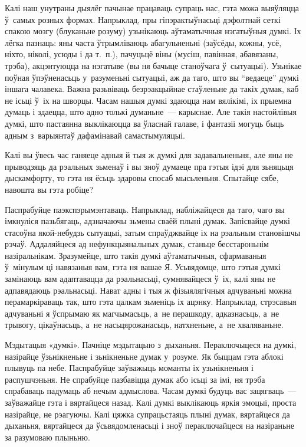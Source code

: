 Калі наш унутраны дыялёг пачынае працаваць супраць нас, гэта можа выяўляцца ў~самых розных формах. Напрыклад, пры гіпэрактыўнасьці дэфолтнай сеткі спакою мозгу (блуканьне розуму) узьнікаюць аўтаматычныя нэгатыўныя думкі. Іх лёгка пазнаць: яны часта ўтрымліваюць абагульненьні (заўсёды, кожны, усё, ніхто, ніколі, усюды і да т.~п.), пачуцьцё віны (мусіш, павінная, абавязаны, трэба), акцэнтуюцца на нэгатыве (вы ня бачыце станоўчага ў~сытуацыі). Узьнікае поўная ўпэўненасьць у~разуменьні сытуацыі, аж да таго, што вы ``ведаеце'' думкі іншага чалавека. Важна разьвіваць безрэакцыйнае стаўленьне да такіх думак, каб не ісьці ў~іх на шворцы. Часам нашыя думкі здаюцца нам вялікімі, іх прыемна думаць і здаецца, што адно толькі думаньне~--- карыснае. Але такія настойлівыя думкі, што пастаянна выклікаюцца ва ўласнай галаве, і фантазіі могуць быць адным з~варыянтаў дафамінавай самастымуляцыі. 

Калі вы ўвесь час ганяеце адныя й тыя ж думкі для задавальненьня, але яны не прыводзяць да рэальных зьменаў і вы зноў думаеце пра гэтыя ідэі для зьняцьця дыскамфорту, то гэта ня ёсьць здаровы спосаб мысьленьня. Спытайце сябе, навошта вы гэта робіце?

Паспрабуйце паэкспэрымэнтаваць. Напрыклад, набліжайцеся да таго, чаго вы імкнуліся пазьбягаць, адзначаючы зьмены сваёй плыні думак. Запісвайце думкі стасоўна якой-небудзь сытуацыі, затым спраўджвайце іх на рэальным становішчы рэчаў. Аддаляйцеся ад нефункцыянальных думак, станьце бесстароньнім назіральнікам. Зразумейце, што такія думкі аўтаматычныя, сфармаваныя ў~мінулым ці навязаныя вам, гэта ня вашае Я. Усьвядомце, што гэтыя думкі замінаюць вам адаптавацца да рэальнасьці, сумнявайцеся ў~іх, калі яны не адпавядаюць рэальнасьці. Нават адны і тыя ж фізыялягічныя адчуваньні можна перамаркіраваць так, што гэта цалкам зьменіць іх ацэнку. Напрыклад, стрэсавыя адчуваньні я ўспрымаю як магчымасьць, а~не перашкоду, адказнасьць, а~не трывогу, цікаўнасьць, а~не насьцярожанасьць, натхненьне, а~не хваляваньне.

Мэдытацыя «думкі». Пачніце мэдытацыю з~дыханьня. Пераключыцеся на думкі, назірайце ўзьнікненьне і зьнікненьне думак у~розуме. Як быццам гэта аблокі плывуць па небе. Паспрабуйце заўважыць моманты іх узьнікненьня і распушчэньня. Не спрабуйце пазбавіцца думак або ісьці за імі, ня трэба спрабаваць падумаць аб нечым адмыслова. Часам думкі будуць вас зацягваць~--- заўважайце гэта і вяртайцеся назад. Калі думкі выклікаюць яркія эмоцыі, проста назірайце, не рэагуючы. Калі цяжка супрацьстаяць плыні думак, вяртайцеся да дыханьня, вяртайцеся да ўсьвядомленасьці і зноў пераключайцеся на назіраньне за разумоваю плыньню.


